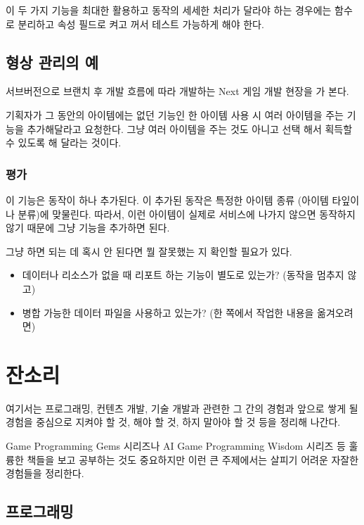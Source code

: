 \documentclass[chapter,kosection, 10.5pt, romanfixed, a4paper]{oblivoir}
\begin{document}
이 두 가지 기능을 최대한 활용하고 동작의 세세한 처리가 달라야 하는 경우에는 함수로 
분리하고 속성 필드로 켜고 꺼서 테스트 가능하게 해야 한다. 

\section{형상 관리의 예}

서브버전으로 브랜치 후 개발 흐름에 따라 개발하는 Next 게임 개발 현장을 가 본다. 

기획자가 그 동안의 아이템에는 없던 기능인 한 아이템 사용 시 여러 아이템을 주는 
기능을 추가해달라고 요청한다. 그냥 여러 아이템을 주는 것도 아니고 선택 해서 
획득할 수 있도록 해 달라는 것이다. 

\subsection{평가}

이 기능은 동작이 하나 추가된다. 이 추가된 동작은 특정한 아이템 종류 (아이템 타잎이나 분류)에 
맞물린다. 따라서, 이런 아이템이 실제로 서비스에 나가지 않으면 동작하지 않기 때문에 
그냥 기능을 추가하면 된다. 

그냥 하면 되는 데 혹시 안 된다면 뭘 잘못했는 지 확인할 필요가 있다. 

\begin{itemize}
\item 데이터나 리소스가 없을 때 리포트 하는 기능이 별도로 있는가? (동작을 멈추지 않고)
\item 병합 가능한 데이터 파일을 사용하고 있는가? (한 쪽에서 작업한 내용을 옮겨오려면)
\end{itemize}

\chapter{잔소리}

여기서는 프로그래밍, 컨텐츠 개발, 기술 개발과 관련한 그 간의 경험과 앞으로 쌓게 될 경험을
중심으로 지켜야 할 것, 해야 할 것, 하지 말아야 할 것 등을 정리해 나간다. 

Game Programming Gems 시리즈나 AI Game Programming Wisdom 시리즈 등 훌륭한 책들을 보고 
공부하는 것도 중요하지만 이런 큰 주제에서는 살피기 어려운 자잘한 경험들을 정리한다. 

\section{프로그래밍}
\end{document}
